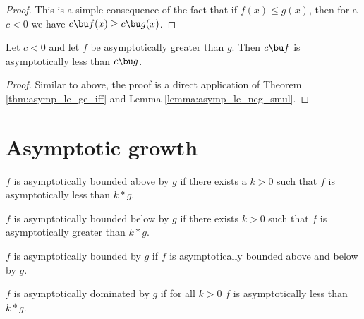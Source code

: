 \begin{proof}
    \leanok
    This is a simple consequence of the fact that if $f(x) \le g(x)$, then for a $c < 0$
    we have $c \bu f(x) \ge c \bu g(x)$.
\end{proof}

\begin{lemma}
    \label{lemma:asymp_ge_neg_smul}
    \leanok
    Let $c < 0$ and let $f$ be asymptotically greater than $g$. Then $c \bu f$ is asymptotically
    less than $c \bu g$.
\end{lemma}

\begin{proof}
    \leanok
    Similar to above, the proof is a direct application of Theorem \ref{thm:asymp_le_ge_iff}
    and Lemma \ref{lemma:asymp_le_neg_smul}.
\end{proof}


\section{Asymptotic growth}

\begin{definition}
    \label{def:asymp_bounded_above}
    \leanok
    $f$ is asymptotically bounded above by $g$ if there exists a $k > 0$ 
    such that $f$ is asymptotically less than $k*g$.
\end{definition}

\begin{definition}
    \label{def:asymp_bounded_below}
    \leanok
    $f$ is asymptotically bounded below by $g$ if there exists $k > 0$ 
    such that $f$ is asymptotically greater than $k*g$.
\end{definition}

\begin{definition}
    \label{def:asymp_bounded}
    \leanok
    $f$ is asymptotically bounded by $g$ if $f$ is asymptotically bounded
    above and below by $g$.
\end{definition}

\begin{definition}
    \label{def:asymp_right_dom}
    \leanok
    $f$ is asymptotically dominated by $g$ if for all $k > 0$ $f$ is asymptotically 
    less than $k*g$.

\end{definition}

